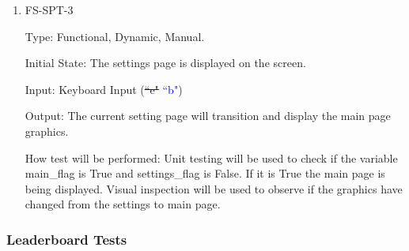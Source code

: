 \documentclass[12pt, titlepage]{article}
\begin{document}
\begin{enumerate}
		\item{FS-SPT-3\\}
		
		Type: Functional, Dynamic, Manual.
		
		Initial State: The settings page is displayed on the screen. 
		
		Input: Keyboard Input (\sout{``e"} \textcolor{blue}{``b"})
		
		Output: The current setting page will transition and display the main page graphics. 
		
		How test will be performed: Unit testing will be used to check if the variable main\_flag is True and settings\_flag is False. If it is True the main page is being displayed. Visual inspection will be used to observe if the graphics have changed from the settings to main page. 
		
	\end{enumerate}
	
	\subsubsection{Leaderboard Tests}
	
\end{document}
